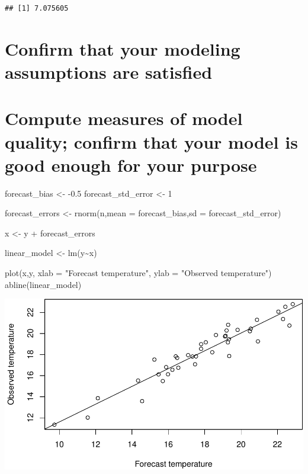 \documentclass[
]{book}
\newenvironment{Shaded}{\begin{snugshade}}{\end{snugshade}}
\newcommand{\AttributeTok}[1]{\textcolor[rgb]{0.77,0.63,0.00}{#1}}
\newcommand{\DecValTok}[1]{\textcolor[rgb]{0.00,0.00,0.81}{#1}}
\newcommand{\FloatTok}[1]{\textcolor[rgb]{0.00,0.00,0.81}{#1}}
\newcommand{\FunctionTok}[1]{\textcolor[rgb]{0.00,0.00,0.00}{#1}}
\newcommand{\NormalTok}[1]{#1}
\newcommand{\OtherTok}[1]{\textcolor[rgb]{0.56,0.35,0.01}{#1}}
\newcommand{\SpecialCharTok}[1]{\textcolor[rgb]{0.00,0.00,0.00}{#1}}
\newcommand{\StringTok}[1]{\textcolor[rgb]{0.31,0.60,0.02}{#1}}
\begin{document}
\begin{verbatim}
## [1] 7.075605
\end{verbatim}

\hypertarget{confirm-that-your-modeling-assumptions-are-satisfied}{%
\section{Confirm that your modeling assumptions are satisfied}\label{confirm-that-your-modeling-assumptions-are-satisfied}}

\hypertarget{compute-measures-of-model-quality-confirm-that-your-model-is-good-enough-for-your-purpose}{%
\section{Compute measures of model quality; confirm that your model is good enough for your purpose}\label{compute-measures-of-model-quality-confirm-that-your-model-is-good-enough-for-your-purpose}}

\begin{Shaded}
\begin{Highlighting}[]
\NormalTok{forecast\_bias }\OtherTok{\textless{}{-}} \SpecialCharTok{{-}}\FloatTok{0.5}
\NormalTok{forecast\_std\_error }\OtherTok{\textless{}{-}} \DecValTok{1}

\NormalTok{forecast\_errors }\OtherTok{\textless{}{-}} \FunctionTok{rnorm}\NormalTok{(n,}\AttributeTok{mean =}\NormalTok{ forecast\_bias,}\AttributeTok{sd =}\NormalTok{ forecast\_std\_error)}

\NormalTok{x }\OtherTok{\textless{}{-}}\NormalTok{ y }\SpecialCharTok{+}\NormalTok{ forecast\_errors}

\NormalTok{linear\_model }\OtherTok{\textless{}{-}} \FunctionTok{lm}\NormalTok{(y}\SpecialCharTok{\textasciitilde{}}\NormalTok{x)}

\FunctionTok{plot}\NormalTok{(x,y, }\AttributeTok{xlab =} \StringTok{"Forecast temperature"}\NormalTok{, }\AttributeTok{ylab =} \StringTok{"Observed temperature"}\NormalTok{)}
\FunctionTok{abline}\NormalTok{(linear\_model)}
\end{Highlighting}
\end{Shaded}

\includegraphics{graphics/unnamed-chunk-5-1.pdf}
\end{document}
